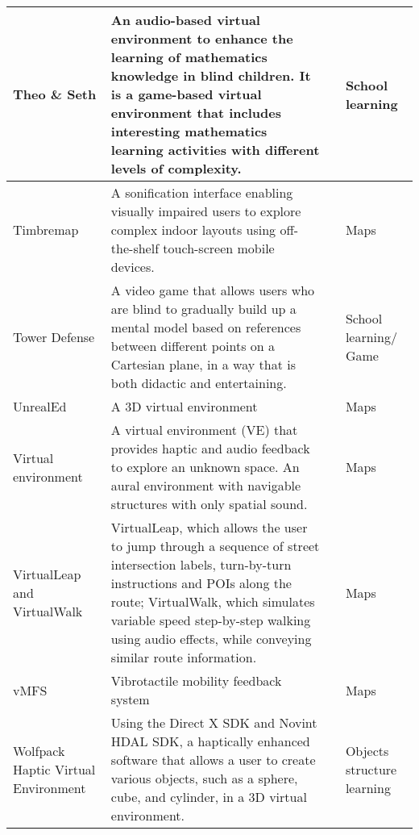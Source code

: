 \begin{small}
\begin{longtable}[h]{m{2.7cm}m{7cm}m{3cm}m{2cm}}
            Theo \& Seth & An audio-based virtual environment to enhance the learning of mathematics knowledge in blind children. It is a game-based virtual environment that includes interesting mathematics learning activities with different levels of complexity. & {\tiny \cite{Sanchez2005}} & School learning \\ \hline
            
            Timbremap & A sonification interface enabling visually impaired users to explore complex indoor layouts using off-the-shelf touch-screen mobile devices. & {\tiny \cite{Su2010}} & Maps \\ \hline
            
            Tower Defense & A video game that allows users who are blind to gradually build up a mental model based on references between different points on a Cartesian plane, in a way that is both didactic and entertaining. & {\tiny \cite{Espinoza2014}} & School learning$/$Game \\ \hline
            
            UnrealEd & A 3D virtual environment & {\tiny \cite{Villane2009}} & Maps \\ \hline
            
            Virtual environment & A virtual environment (VE) that provides haptic and audio feedback to explore an unknown space. An aural environment with navigable structures with only spatial sound. & {\tiny \cite{Lahav2008b,Sanchez2000}} & Maps \\ \hline
            
            VirtualLeap and VirtualWalk & VirtualLeap, which allows the user to jump through a sequence of street intersection labels, turn-by-turn instructions and POIs along the route; VirtualWalk, which simulates variable speed step-by-step walking using audio effects, while conveying similar route information. & {\tiny \cite{Guerreiro2017}} & Maps \\ \hline
            
            vMFS & Vibrotactile mobility feedback system & {\tiny \cite{Adebiyi2017}} & Maps \\ \hline
            
            Wolfpack Haptic Virtual Environment & Using the Direct X SDK and Novint HDAL SDK, a haptically enhanced software that allows a user to create various objects, such as a sphere, cube, and cylinder, in a 3D virtual environment. & {\tiny \cite{Lee2014a}} & Objects structure learning \\ 

            
\end{longtable}

\end{small}